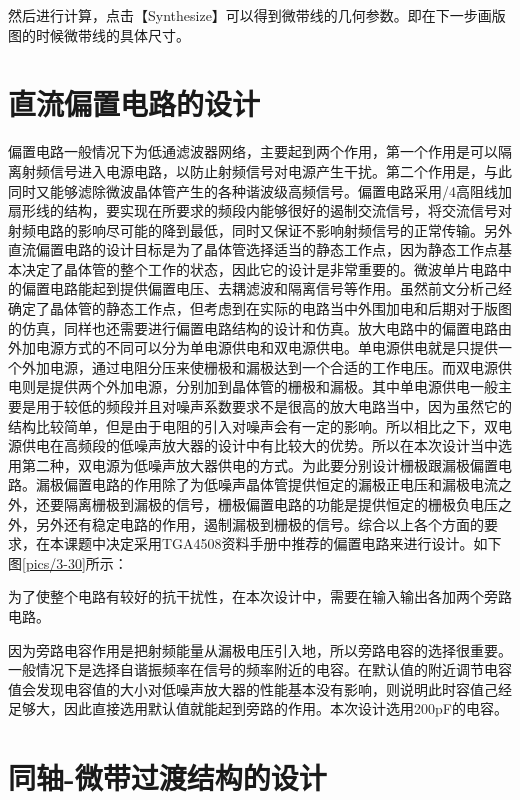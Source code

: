 然后进行计算，点击【Synthesize】可以得到微带线的几何参数。即在下一步画版图的时候微带线的具体尺寸。

\section{直流偏置电路的设计}
偏置电路一般情况下为低通滤波器网络，主要起到两个作用，第一个作用是可以隔离射频信号进入电源电路，以防止射频信号对电源产生干扰。第二个作用是，与此同时又能够滤除微波晶体管产生的各种谐波级高频信号。偏置电路采用/4高阻线加扇形线的结构，要实现在所要求的频段内能够很好的遏制交流信号，将交流信号对射频电路的影响尽可能的降到最低，同时又保证不影响射频信号的正常传输。另外直流偏置电路的设计目标是为了晶体管选择适当的静态工作点，因为静态工作点基本决定了晶体管的整个工作的状态，因此它的设计是非常重要的。微波单片电路中的偏置电路能起到提供偏置电压、去耦滤波和隔离信号等作用。虽然前文分析己经确定了晶体管的静态工作点，但考虑到在实际的电路当中外围加电和后期对于版图的仿真，同样也还需要进行偏置电路结构的设计和仿真。放大电路中的偏置电路由外加电源方式的不同可以分为单电源供电和双电源供电。单电源供电就是只提供一个外加电源，通过电阻分压来使栅极和漏极达到一个合适的工作电压。而双电源供电则是提供两个外加电源，分别加到晶体管的栅极和漏极。其中单电源供电一般主要是用于较低的频段并且对噪声系数要求不是很高的放大电路当中，因为虽然它的结构比较简单，但是由于电阻的引入对噪声会有一定的影响。所以相比之下，双电源供电在高频段的低噪声放大器的设计中有比较大的优势。所以在本次设计当中选用第二种，双电源为低噪声放大器供电的方式。为此要分别设计栅极跟漏极偏置电路。漏极偏置电路的作用除了为低噪声晶体管提供恒定的漏极正电压和漏极电流之外，还要隔离栅极到漏极的信号，栅极偏置电路的功能是提供恒定的栅极负电压之外，另外还有稳定电路的作用，遏制漏极到栅极的信号。综合以上各个方面的要求，在本课题中决定采用TGA4508资料手册中推荐的偏置电路来进行设计。如下图\ref{pics/3-30}所示：

为了使整个电路有较好的抗干扰性，在本次设计中，需要在输入输出各加两个旁路电路。

因为旁路电容作用是把射频能量从漏极电压引入地，所以旁路电容的选择很重要。一般情况下是选择自谐振频率在信号的频率附近的电容。在默认值的附近调节电容值会发现电容值的大小对低噪声放大器的性能基本没有影响，则说明此时容值己经足够大，因此直接选用默认值就能起到旁路的作用。本次设计选用200pF的电容。 

\section{同轴-微带过渡结构的设计}

